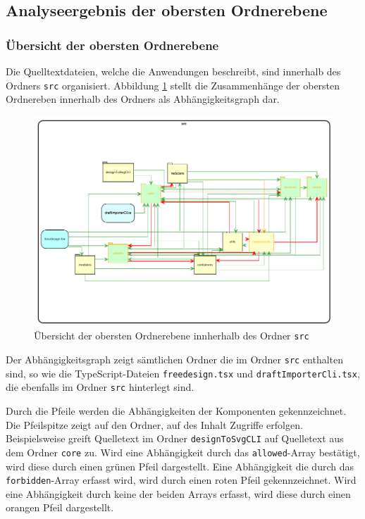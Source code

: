 \subsection{Analyseergebnis der obersten Ordnerebene}
\subsubsection{Übersicht der obersten Ordnerebene}
Die Quelltextdateien, welche die Anwendungen beschreibt, sind innerhalb des Ordners \lstinline|src| organisiert. 
Abbildung \ref{fig:obersteOrdnerebene} stellt die Zusammenhänge der obersten Ordnereben innerhalb des Ordners als Abhängigkeitsgraph dar. 
\begin{figure}[H]
	\centering
    \caption{Übersicht der obersten Ordnerebene innherhalb des Ordner \lstinline|src|}
	\label{fig:obersteOrdnerebene}
	\includegraphics{diagrams/Ist-Architektur/Projektuebersicht.pdf}
\end{figure}

Der Abhängigkeitsgraph zeigt sämtlichen Ordner die im Ordner \lstinline|src| enthalten sind, so wie die TypeScript-Dateien \lstinline|freedesign.tsx| und \lstinline|draftImporterCli.tsx|, die ebenfalls im Ordner \lstinline|src| hinterlegt sind.  

Durch die Pfeile werden die Abhängigkeiten der Komponenten gekennzeichnet. Die Pfeilspitze zeigt auf den Ordner, auf des Inhalt Zugriffe erfolgen. Beispielsweise greift Quelletext im Ordner \lstinline|designToSvgCLI| auf Quelletext aus dem Ordner \lstinline|core| zu.
Wird eine Abhängigkeit durch das \lstinline|allowed|-Array bestätigt, wird diese durch einen grünen Pfeil dargestellt. Eine Abhängigkeit die durch das \lstinline|forbidden|-Array erfasst wird, wird durch einen roten Pfeil gekennzeichnet. Wird eine Abhängigkeit durch keine der beiden Arrays erfasst, wird diese durch einen orangen Pfeil dargestellt.

